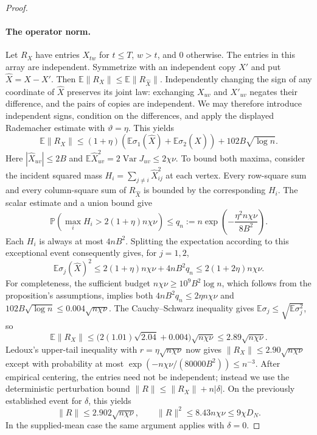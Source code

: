 \documentclass[11pt,a4paper]{article}
\theoremstyle{definition}
\theoremstyle{remark}
\newcommand{\E}{\mathbb E}
\newcommand{\Prb}{\mathbb P}
\begin{document}
\begin{proof}
\paragraph{The operator norm.}
Let $R_X$ have entries $X_{tw}$ for $t\le T$, $w>t$, and $0$ otherwise.
The entries in this array are independent. Symmetrize with an independent
copy $X'$ and put $\widehat X=X-X'$. Then
$\E\|R_X\|\le\E\|R_{\widehat X}\|$.
Independently changing the sign of any coordinate of $\widehat X$ preserves
its joint law: exchanging $X_{uv}$ and $X'_{uv}$ negates their difference,
and the pairs of copies are independent. We may therefore introduce
independent signs, condition on the differences, and apply the displayed
Rademacher estimate with $\vartheta=\eta$. This yields
\[
 \E\|R_X\|\le
 (1+\eta)(\E\sigma_1(\widehat X)+\E\sigma_2(\widehat X))
       +102B\sqrt{\log n}.
\]
Here $|\widehat X_{uv}|\le2B$ and
$\E\widehat X_{uv}^2=2\operatorname{Var}J_{uv}\le2\chi\nu$.
To bound both maxima, consider the incident squared mass
$H_i=\sum_{j\ne i}\widehat X_{ij}^2$ at each vertex. Every row-square
sum and every column-square sum of $R_{\widehat X}$ is bounded by the
corresponding $H_i$. The scalar estimate and a union bound give
\[
 \Prb\!\left(\max_i H_i>2(1+\eta)n\chi\nu\right)
 \le q_n:=n\exp\!\left(-\frac{\eta^2n\chi\nu}{8B^2}\right).
\]
Each $H_i$ is always at most $4nB^2$. Splitting the expectation according
to this exceptional event consequently gives, for $j=1,2$,
\[
 \E\sigma_j(\widehat X)^2
 \le2(1+\eta)n\chi\nu+4nB^2q_n
 \le2(1+2\eta)n\chi\nu.
\]
For completeness, the sufficient budget
$n\chi\nu\ge10^9B^2\log n$, which follows from the proposition's
assumptions, implies both
$4nB^2q_n\le2\eta n\chi\nu$ and
$102B\sqrt{\log n}\le0.004\sqrt{n\chi\nu}$.
The Cauchy--Schwarz inequality gives
$\E\sigma_j\le\sqrt{\E\sigma_j^2}$, so
\[
 \E\|R_X\|
 \le\bigl(2(1.01)\sqrt{2.04}+0.004\bigr)\sqrt{n\chi\nu}
 \le2.89\sqrt{n\chi\nu}.
\]
Ledoux's upper-tail inequality with $r=\eta\sqrt{n\chi\nu}$ now gives
$\|R_X\|\le2.90\sqrt{n\chi\nu}$ except with probability at most
$\exp(-n\chi\nu/(80000B^2))\le n^{-3}$.
After empirical centering, the entries need not be independent; instead
we use the deterministic perturbation bound
$\|R\|\le\|R_X\|+n|\delta|$. On the previously established event for
$\delta$, this yields
\[
 \|R\|\le2.902\sqrt{n\chi\nu},\qquad
 \|R\|^2\le8.43n\chi\nu\le9\chi D_N.
\]
In the supplied-mean case the same argument applies with $\delta=0$.


\end{proof}
\end{document}
